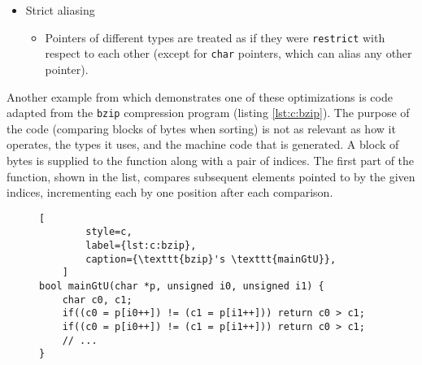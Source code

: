 \begin{itemize}
{\begin{itemize}
                    bits ($2^{16} = 65536$).
                \item
                    The integer categories in C would not be enough to express
                    all desirable widths in common platforms (this predated the
                    C99 fixed width types).  With an 8-bit \texttt{char} and a
                    64-bit \texttt{int}, the only intermediate type,
                    \texttt{short}, would have to be either 16- or 32-bit, and
                    there would be no type left for the other size.
                \item
                    Integer promotion rules would convert values with a rank
                    less than \texttt{int} to 64-bit in all arithmetic
                    expressions.
            \end{itemize}
        }
    \item Strict aliasing
        \begin{itemize}
            \item
                Pointers of different types are treated as if they were
                \texttt{restrict} with respect to each other (except for
                \texttt{char} pointers, which can alias any other pointer).
        \end{itemize}
\end{itemize}

Another example from \cite{Carruth2016} which demonstrates one of these
optimizations is code adapted from the \texttt{bzip} compression program
(listing \ref{lst:c:bzip}).  The purpose of the code (comparing blocks of bytes
when sorting) is not as relevant as how it operates, the types it uses, and the
machine code that is generated\footnotemark.  A block of bytes is supplied to
the function along with a pair of indices.  The first part of the function,
shown in the list, compares subsequent elements pointed to by the given indices,
incrementing each by one position after each comparison.


\begin{figure}[ht]
    \begin{lstlisting}[
        style=c,
        label={lst:c:bzip},
        caption={\texttt{bzip}'s \texttt{mainGtU}},
    ]
bool mainGtU(char *p, unsigned i0, unsigned i1) {
    char c0, c1;
    if((c0 = p[i0++]) != (c1 = p[i1++])) return c0 > c1;
    if((c0 = p[i0++]) != (c1 = p[i1++])) return c0 > c1;
    // ...
}
    \end{lstlisting}
\end{figure}

